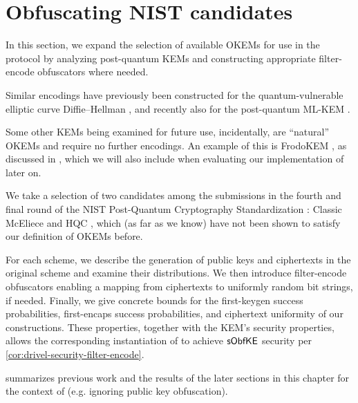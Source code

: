 \chapter{Obfuscating NIST candidates}\label{ch:obfuscation}

In this section, we expand the selection of available OKEMs for use in the \drivel{} protocol by analyzing post-quantum KEMs and constructing appropriate filter-encode obfuscators where needed.

Similar encodings have previously been constructed for the quantum-vulnerable elliptic curve Diffie–Hellman \cite{EC:vAhHop04,tor-dev-udh,USENIX:WWGH11,CCS:BHKL13,FC:Tibouchi14}, and recently also for the post-quantum ML-KEM \cite{fips203,CCS:GunSteVei24}.

Some other KEMs being examined for future use, incidentally, are ``natural'' OKEMs and require no further encodings. An example of this is FrodoKEM \cite{NISTPQC-R3:FrodoKEM20}, as discussed in \cite[Section~2.1]{EPRINT:GRSV25}, which we will also include when evaluating our implementation of \drivel{} later on.

We take a selection of two candidates among the submissions in the fourth and final round of the NIST Post-Quantum Cryptography Standardization \cite{nist-standardization}: Classic McEliece \cite{NISTPQC-R4:ClassicMcEliece22} and HQC \cite{NISTPQC-R4:HQC22}, which (as far as we know) have not been shown to satisfy our definition of OKEMs before.

For each scheme, we describe the generation of public keys and ciphertexts in the original scheme and examine their distributions. We then introduce filter-encode obfuscators enabling a mapping from ciphertexts to uniformly random bit strings, if needed.
Finally, we give concrete bounds for the first-keygen success probabilities, first-encaps success probabilities, and ciphertext uniformity of our constructions. These properties, together with the KEM's security properties, allows the corresponding instantiation of \drivel{} to achieve $\mathsf{sObfKE}$ security per \cref{cor:drivel-security-filter-encode}.

 summarizes previous work and the results of the later sections in this chapter for the context of \drivel{} (e.g. ignoring public key obfuscation).

